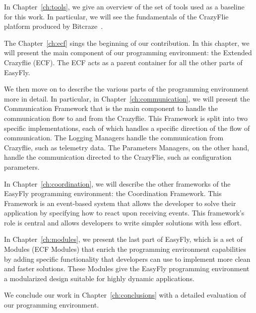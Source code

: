 In Chapter~\ref{ch:tools}, we give an overview of the set of tools used as a baseline for this work. 
In particular, we will see the fundamentals of the CrazyFlie platform produced by Bitcraze~\cite{bitcraze}.

The Chapter~\ref{ch:ecf} sings the beginning of our contribution. 
In this chapter, we will present the main component of our programming environment: the Extended Crazyflie (ECF).
The ECF acts as a parent container for all the other parts of EasyFly.

We then move on to describe the various parts of the programming environment more in detail. 
In particular, in Chapter~\ref{ch:communication}, we will present the Communication Framework that is the main component to handle the communication flow to and from the Crazyflie.
This Framework is split into two specific implementations, each of which handles a specific direction of the flow of communication. 
The Logging Managers handle the communication from Crazyflie, such as telemetry data.
The Parameters Managers, on the other hand, handle the communication directed to the CrazyFlie, such as configuration parameters.

In Chapter~\ref{ch:coordination}, we will describe the other frameworks of the EasyFly programming environment: the Coordination Framework.
This Framework is an event-based system that allows the developer to solve their application by specifying how to react upon receiving events.
This framework's role is central and allows developers to write simpler solutions with less effort.

In Chapter~\ref{ch:modules}, we present the last part of EasyFly, which is a set of Modules (ECF Modules) that enrich the programming environment capabilities by adding specific functionality that developers can use to implement more clean and faster solutions.
These Modules give the EasyFly programming environment a modularized design suitable for highly dynamic applications. 

We conclude our work in Chapter~\ref{ch:conclusions} with a detailed evaluation of our programming environment.